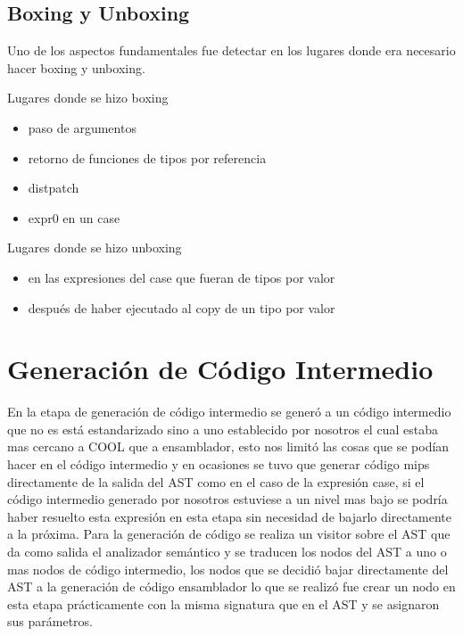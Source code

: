 \documentclass[12pt,a4paper]{article}
\begin{document}
		\subsection{Boxing y Unboxing}
			Uno de los aspectos fundamentales fue detectar en los lugares donde era necesario hacer boxing y unboxing.
			\begin{center}
				Lugares donde se hizo boxing 
			\end{center} 
			\begin{multicols}{2}
				\begin{itemize}
					\item paso de argumentos
					\item retorno de funciones de tipos por referencia
					\item distpatch
					\item expr0 en un case
				\end{itemize}
			\end{multicols}
			\begin{center}
				Lugares donde se hizo unboxing 
			\end{center} 
			\begin{multicols}{2}
				\begin{itemize}
					\item en las expresiones del case que fueran de tipos por valor
					\item después de haber ejecutado al copy de un tipo por valor
				\end{itemize}
			\end{multicols}
	\section{Generación de Código Intermedio}
		En la etapa de generación de código intermedio se generó a un código intermedio que no es está estandarizado sino a uno establecido por nosotros el cual estaba mas cercano a COOL que a ensamblador, esto nos limitó las cosas que se podían hacer en el código intermedio y en ocasiones se tuvo que generar código mips directamente de la salida del AST como en el caso de la expresión case, si el código intermedio generado por nosotros estuviese a un nivel mas bajo se podría haber resuelto esta expresión en esta etapa sin necesidad de bajarlo directamente a la próxima. Para la generación de código se realiza un visitor sobre el AST que da como salida el analizador semántico y se traducen los nodos del AST a uno o mas nodos de código intermedio, los nodos que se decidió bajar directamente del AST a la generación de código ensamblador lo que se realizó fue crear un nodo en esta etapa prácticamente con la misma signatura que en el AST y se asignaron sus parámetros.
\end{document}

